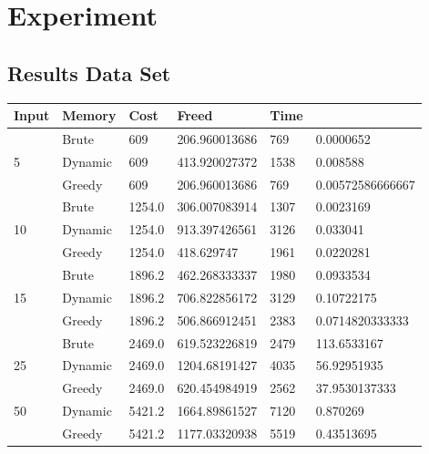 \documentclass{article}
\begin{document}
\section{Experiment}


\subsection{Results Data Set}
\begin{adjustwidth}{-.35cm}{}
    \begin{center}
        \begin{tabular}{l|lllll} \toprule
\textbf{Input}   & \textbf{Memory}    & \textbf{Cost}             & \textbf{Freed}    &  \textbf{Time}                 \\ \hline
        & Brute   & 609       & 206.960013686    & 769      &  0.0000652            \\
5       & Dynamic & 609       & 413.920027372    & 1538     &  0.008588             \\
        & Greedy  & 609       & 206.960013686    & 769      &  0.00572586666667     \\ \midrule
        & Brute   & 1254.0    & 306.007083914    & 1307     &  0.0023169            \\
10      & Dynamic & 1254.0    & 913.397426561    & 3126     &  0.033041             \\
        & Greedy  & 1254.0    & 418.629747       & 1961     &  0.0220281            \\ \midrule
        & Brute   & 1896.2    & 462.268333337    & 1980     &  0.0933534            \\
15      & Dynamic & 1896.2    & 706.822856172    & 3129     &  0.10722175           \\
        & Greedy  & 1896.2    & 506.866912451    & 2383     &  0.0714820333333      \\ \midrule
        & Brute   & 2469.0    & 619.523226819    & 2479     &  113.6533167          \\
25      & Dynamic & 2469.0    & 1204.68191427    & 4035     &  56.92951935          \\
        & Greedy  & 2469.0    & 620.454984919    & 2562     &  37.9530137333        \\ \midrule
50      & Dynamic & 5421.2    & 1664.89861527    & 7120     &  0.870269             \\
        & Greedy  & 5421.2    & 1177.03320938    & 5519     &  0.43513695           \\ \midrule

\end{tabular}
\end{center}
\end{adjustwidth}
\end{document}
